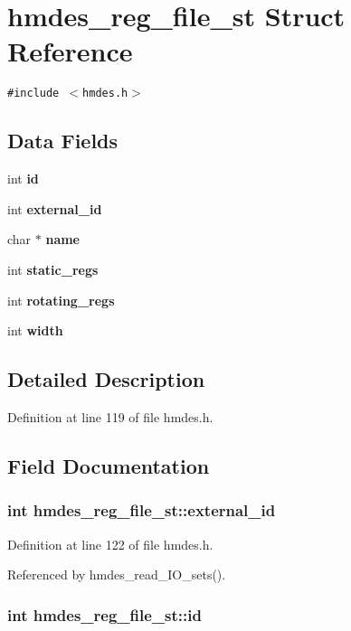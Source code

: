 \section{hmdes\_\-reg\_\-file\_\-st Struct Reference}
\label{structhmdes__reg__file__st}
{\tt \#include $<$hmdes.h$>$}

\subsection*{Data Fields}
\begin{CompactItemize}
\item 
int \bf{id}
\item 
int \bf{external\_\-id}
\item 
char $\ast$ \bf{name}
\item 
int \bf{static\_\-regs}
\item 
int \bf{rotating\_\-regs}
\item 
int \bf{width}
\end{CompactItemize}


\subsection{Detailed Description}




Definition at line 119 of file hmdes.h.

\subsection{Field Documentation}
\subsubsection{\setlength{\rightskip}{0pt plus 5cm}int \bf{hmdes\_\-reg\_\-file\_\-st::external\_\-id}}\label{structhmdes__reg__file__st_086fa4606ff9185000ba2f40deccb58d}




Definition at line 122 of file hmdes.h.

Referenced by hmdes\_\-read\_\-IO\_\-sets().
\subsubsection{\setlength{\rightskip}{0pt plus 5cm}int \bf{hmdes\_\-reg\_\-file\_\-st::id}}\label{structhmdes__reg__file__st_48f2ea1e2379bb504019fb0a5a7c2d79}




